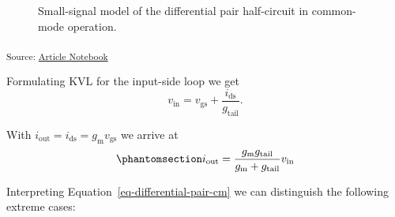 \documentclass[
  a4paper,
  DIV=11,
  numbers=noendperiod]{scrartcl}
\begin{document}
\begin{figure}[H]


\caption{\label{fig-differential-pair-cm}Small-signal model of the
differential pair half-circuit in common-mode operation.}

\end{figure}%

\textsubscript{Source:
\href{https://iic-jku.github.io/analog-circuit-design/index.qmd.html}{Article
Notebook}}

Formulating KVL for the input-side loop we get \[
v_\mathrm{in} = v_\mathrm{gs}+ \frac{i_\mathrm{ds}}{g_\mathrm{tail}}.
\]

With \(i_\mathrm{out} = i_\mathrm{ds}= g_\mathrm{m}v_\mathrm{gs}\) we
arrive at
\begin{equation}\phantomsection\label{eq-differential-pair-cm}{
i_\mathrm{out} = \frac{g_\mathrm{m}g_\mathrm{tail}}{g_\mathrm{m}+ g_\mathrm{tail}} v_\mathrm{in}
}\end{equation}

Interpreting Equation~\ref{eq-differential-pair-cm} we can distinguish
the following extreme cases:
\end{document}
